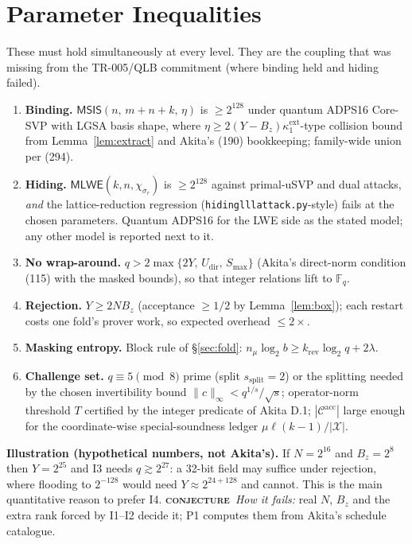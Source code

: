 \documentclass[11pt]{article}
\newcommand{\epitag}[3]{\colorbox{#2}{\textcolor{#1}{\textsc{\footnotesize\bfseries #3}}}}
\newcommand{\conjectureTag}{\epitag{conjyellow}{conjbg}{conjecture}}
\renewcommand{\_}{\textunderscore\allowbreak{}}
\newcommand{\code}[1]{\texttt{\small #1}}
\theoremstyle{definition}
\begin{document}
\section{Parameter Inequalities}
\label{sec:params}
These must hold simultaneously at every level. They are the coupling that was missing from the TR-005/QLB commitment (where binding held and hiding failed).
\begin{enumerate}[leftmargin=1.6em,label=\textbf{I\arabic*.}]
\item \textbf{Binding.} $\mathsf{MSIS}(n,\,m+n+k,\,\eta)$ is $\ge2^{128}$ under quantum ADPS16 Core-SVP with LGSA basis shape, where $\eta\ge2(Y-B_z)\kappa_1^{\mathrm{ext}}$-type collision bound from Lemma~\ref{lem:extract} and Akita's (190) bookkeeping; family-wide union per (294).
\item \textbf{Hiding.} $\mathsf{MLWE}(k,n,\chi_{\sigma_r})$ is $\ge2^{128}$ against primal-uSVP and dual attacks, \emph{and} the lattice-reduction regression (\code{hiding\_lll\_attack.py}-style) fails at the chosen parameters. Quantum ADPS16 for the LWE side as the stated model; any other model is reported next to it.
\item \textbf{No wrap-around.} $q>2\max\{2Y,\,U_{\mathrm{dir}},\,S_{\max}\}$ (Akita's direct-norm condition (115) with the masked bounds), so that integer relations lift to $\mathbb{F}_q$.
\item \textbf{Rejection.} $Y\ge2NB_z$ (acceptance $\ge1/2$ by Lemma~\ref{lem:box}); each restart costs one fold's prover work, so expected overhead $\le2\times$.
\item \textbf{Masking entropy.} Block rule of \S\ref{sec:fold}: $n_\mu\log_2b\ge k_{\mathrm{rev}}\log_2q+2\lambda$.
\item \textbf{Challenge set.} $q\equiv5\pmod 8$ prime (split $s_{\mathrm{split}}=2$) or the splitting needed by the chosen invertibility bound $\|c\|_\infty<q^{1/s}/\sqrt s$; operator-norm threshold $T$ certified by the integer predicate of Akita D.1; $|\mathcal{C}^{\mathrm{acc}}|$ large enough for the coordinate-wise special-soundness ledger $\mu\ell(k-1)/|\mathcal{X}|$.
\end{enumerate}
\textbf{Illustration (hypothetical numbers, not Akita's).} If $N=2^{16}$ and $B_z=2^{8}$ then $Y=2^{25}$ and I3 needs $q\gtrsim2^{27}$: a 32-bit field may suffice under rejection, where flooding to $2^{-128}$ would need $Y\approx2^{24+128}$ and cannot. This is the main quantitative reason to prefer I4. \conjectureTag\ \textit{How it fails:} real $N$, $B_z$ and the extra rank forced by I1--I2 decide it; P1 computes them from Akita's schedule catalogue.
\end{document}
